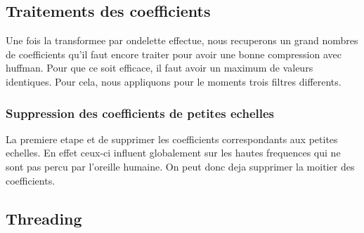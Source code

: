 \documentclass[a4paper,12pt]{article}
\begin{document}
\subsection{Traitements des coefficients}
Une fois la transformee par ondelette effectue, nous recuperons un
grand nombres de coefficients qu'il faut encore traiter pour avoir une
bonne compression avec huffman. Pour que ce soit efficace, il faut
avoir un maximum de valeurs identiques. Pour cela, nous appliquons
pour le moments trois filtres differents.
\subsubsection{Suppression des coefficients de petites echelles}
La premiere etape et de supprimer les coefficients correspondants aux
petites echelles. En effet ceux-ci influent globalement sur les hautes
frequences qui ne sont pas percu par l'oreille humaine. On peut donc
deja supprimer la moitier des coefficients.

	\subsection{Threading}
\end{document}
